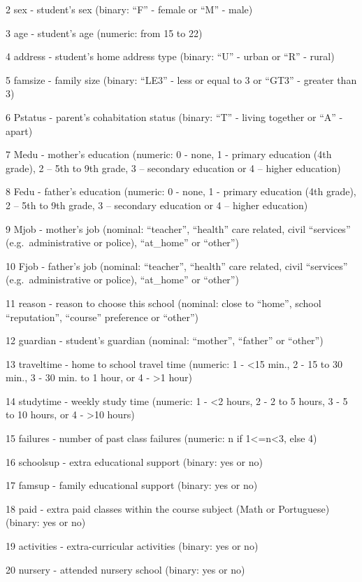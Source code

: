 \documentclass[
]{article}
\begin{document}
2 sex - student's sex (binary: ``F'' - female or ``M'' - male)

3 age - student's age (numeric: from 15 to 22)

4 address - student's home address type (binary: ``U'' - urban or ``R''
- rural)

5 famsize - family size (binary: ``LE3'' - less or equal to 3 or ``GT3''
- greater than 3)

6 Pstatus - parent's cohabitation status (binary: ``T'' - living
together or ``A'' - apart)

7 Medu - mother's education (numeric: 0 - none, 1 - primary education
(4th grade), 2 -- 5th to 9th grade, 3 -- secondary education or 4 --
higher education)

8 Fedu - father's education (numeric: 0 - none, 1 - primary education
(4th grade), 2 -- 5th to 9th grade, 3 -- secondary education or 4 --
higher education)

9 Mjob - mother's job (nominal: ``teacher'', ``health'' care related,
civil ``services'' (e.g.~administrative or police), ``at\_home'' or
``other'')

10 Fjob - father's job (nominal: ``teacher'', ``health'' care related,
civil ``services'' (e.g.~administrative or police), ``at\_home'' or
``other'')

11 reason - reason to choose this school (nominal: close to ``home'',
school ``reputation'', ``course'' preference or ``other'')

12 guardian - student's guardian (nominal: ``mother'', ``father'' or
``other'')

13 traveltime - home to school travel time (numeric: 1 - \textless15
min., 2 - 15 to 30 min., 3 - 30 min. to 1 hour, or 4 - \textgreater1
hour)

14 studytime - weekly study time (numeric: 1 - \textless2 hours, 2 - 2
to 5 hours, 3 - 5 to 10 hours, or 4 - \textgreater10 hours)

15 failures - number of past class failures (numeric: n if
1\textless=n\textless3, else 4)

16 schoolsup - extra educational support (binary: yes or no)

17 famsup - family educational support (binary: yes or no)

18 paid - extra paid classes within the course subject (Math or
Portuguese) (binary: yes or no)

19 activities - extra-curricular activities (binary: yes or no)

20 nursery - attended nursery school (binary: yes or no)
\end{document}
